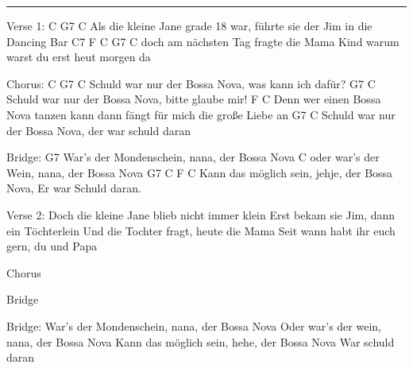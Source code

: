 \noindent\rule{\columnwidth}{1pt}

\begin{lstsong}
Verse 1:
C                             G7                                     C
Als die kleine Jane grade 18 war, führte sie der Jim in die Dancing Bar
                 C7               F        C             G7               C
doch am nächsten Tag fragte die Mama Kind warum warst du erst heut morgen da

Chorus:
   C                     G7                   C
Schuld war nur der Bossa Nova, was kann ich dafür?
                         G7                 C
Schuld war nur der Bossa Nova, bitte glaube mir!
                     F                                        C
Denn wer einen Bossa Nova tanzen kann dann fängt für mich die große Liebe an
                         G7                     C
Schuld war nur der Bossa Nova, der war schuld daran

Bridge:
                G7
War's der Mondenschein, nana, der Bossa Nova
               C
oder war's der Wein, nana, der Bossa Nova
                 G7                           C      F        C
Kann das möglich sein, jehje, der Bossa Nova, Er war Schuld daran.

Verse 2:
Doch die kleine Jane blieb nicht immer klein
Erst bekam sie Jim, dann ein Töchterlein
Und die Tochter fragt, heute die Mama
Seit wann habt ihr euch gern, du und Papa

Chorus

Bridge

Bridge:
War's der Mondenschein, nana, der Bossa Nova
Oder war's der wein, nana, der Bossa Nova
Kann das möglich sein, hehe, der Bossa Nova
War schuld daran
\end{lstsong}
\newpage
